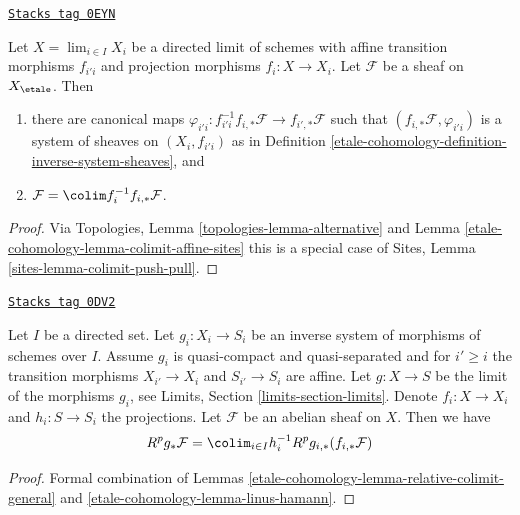\begin{lemma}
\label{etale-cohomology-lemma-linus-hamann}
\href{https://stacks.math.columbia.edu/tag/0EYN}{\texttt{Stacks tag 0EYN}}

Let $X = \lim_{i \in I} X_i$ be a directed limit of schemes
with affine transition morphisms $f_{i'i}$ and projection morphisms
$f_i : X \to X_i$. Let $\mathcal{F}$ be a sheaf on $X_\etale$. Then
\begin{enumerate}
\item there are canonical maps
$\varphi_{i'i} : f_{i'i}^{-1}f_{i, *}\mathcal{F} \to f_{i', *}\mathcal{F}$
such that $(f_{i, *}\mathcal{F}, \varphi_{i'i})$ is a system of
sheaves on $(X_i, f_{i'i})$ as in
Definition \ref{etale-cohomology-definition-inverse-system-sheaves}, and
\item $\mathcal{F} = \colim f_i^{-1}f_{i, *}\mathcal{F}$.
\end{enumerate}
\end{lemma}

\begin{proof}
Via Topologies, Lemma \ref{topologies-lemma-alternative} and
Lemma \ref{etale-cohomology-lemma-colimit-affine-sites} this is a special case of
Sites, Lemma \ref{sites-lemma-colimit-push-pull}.
\end{proof}

\begin{lemma}
\label{etale-cohomology-lemma-compute-strangely}
\href{https://stacks.math.columbia.edu/tag/0DV2}{\texttt{Stacks tag 0DV2}}

Let $I$ be a directed set. Let $g_i : X_i \to S_i$ be an inverse system of
morphisms of schemes over $I$. Assume $g_i$ is quasi-compact and
quasi-separated and for $i' \geq i$ the transition morphisms
$X_{i'} \to X_i$ and $S_{i'} \to S_i$ are affine.
Let $g : X \to S$ be the limit of the morphisms $g_i$, see
Limits, Section \ref{limits-section-limits}.
Denote $f_i : X \to X_i$ and $h_i : S \to S_i$ the projections.
Let $\mathcal{F}$ be an  abelian sheaf on $X$. Then we have
$$
R^pg_*\mathcal{F} = \colim_{i \in I} h_i^{-1}R^pg_{i, *}(f_{i, *}\mathcal{F})
$$
\end{lemma}

\begin{proof}
Formal combination of Lemmas \ref{etale-cohomology-lemma-relative-colimit-general}
and \ref{etale-cohomology-lemma-linus-hamann}.
\end{proof}

